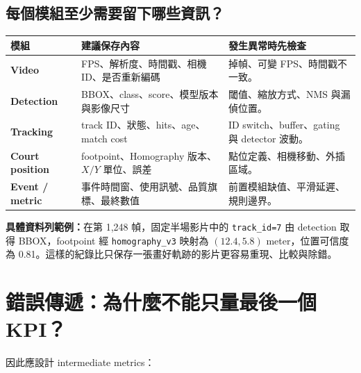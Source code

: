 \documentclass[11pt,a4paper,oneside]{report}
\begin{document}
\subsection{每個模組至少需要留下哪些資訊？}

\begin{tabularx}{\textwidth}{>{\bfseries}p{2.8cm} Y Y}
\toprule
模組 & 建議保存內容 & 發生異常時先檢查 \\
\midrule
Video & FPS、解析度、時間戳、相機 ID、是否重新編碼 & 掉幀、可變 FPS、時間戳不一致。\\
Detection & BBOX、class、score、模型版本與影像尺寸 & 閾值、縮放方式、NMS 與漏偵位置。\\
Tracking & track ID、狀態、hits、age、match cost & ID switch、buffer、gating 與 detector 波動。\\
Court position & footpoint、Homography 版本、$X/Y$ 單位、誤差 & 點位定義、相機移動、外插區域。\\
Event / metric & 事件時間窗、使用訊號、品質旗標、最終數值 & 前置模組缺值、平滑延遲、規則邊界。\\
\bottomrule
\end{tabularx}

\begin{plainBox}
\textbf{具體資料列範例：}在第 1,248 幀，固定半場影片中的 \texttt{track\_id=7} 由 detection 取得 BBOX，footpoint 經 \texttt{homography\_v3} 映射為 $(12.4, 5.8)$ meter，位置可信度為 0.81。這樣的紀錄比只保存一張畫好軌跡的影片更容易重現、比較與除錯。
\end{plainBox}

\section{錯誤傳遞：為什麼不能只量最後一個 KPI？}

\begin{center}
\end{center}

因此應設計 intermediate metrics：
\end{document}
